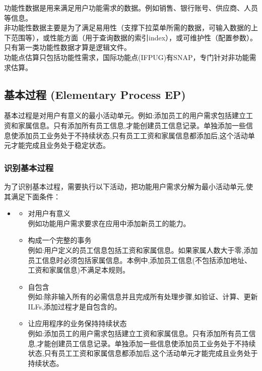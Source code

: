 功能性数据是用来满足用户功能需求的数据。例如销售、银行账号、供应商、人员等信息。\\
非功能性数据主要是为了满足易用性（支撑下拉菜单所需的数据，可输入数据的上下范围等），或性能方面（用于查询数据的索引index），或可维护性（配置参数）。\\
只有第一类功能性数据才算是逻辑文件。\\
功能点估算只包括功能性需求，国际功能点(IFPUG)有SNAP，专门针对非功能需求估算。

\hypertarget{ux57faux672cux8fc7ux7a0b-elementary-process}{%
\subsection{基本过程 (Elementary
Process EP)}\label{ux57faux672cux8fc7ux7a0b-elementary-process}}

基本过程是对用户有意义的最小活动单元。例如:添加员工的用户需求包括建立工资和家属信息。只有添加所有员工信息,才能创建员工信息记录。单独添加一些信息使添加员工业务处于不持续状态,只有员工工资和家属信息都添加后,这个活动单元才能完成且业务处于稳定状态。

\hypertarget{ux8bc6ux522bux57faux672cux8fc7ux7a0b}{%
\subsubsection{识别基本过程}\label{ux8bc6ux522bux57faux672cux8fc7ux7a0b}}

为了识别基本过程，需要执行以下活动，把功能用户需求分解为最小活动单元,使其满足下面条件：

\begin{itemize}
\item
  \begin{itemize}
  \tightlist
  \item
    对用户有意义\\
    例如功能用户需求要求在应用中添加新员工的能力。\\
  \item
    构成一个完整的事务\\
    例如:用户定义的员工信息包括工资和家属信息。如果家属人数大于零,添加员工信息时必须包括家属信息。本例中,添加员工信息(不包括添加地址、工资和家属信息)不满足本规则。\\
  \item
    自包含\\
    例如:除非输入所有的必需信息并且完成所有处理步骤,如验证、计算、更新ILFs,添加过程才是自包含的。\\
  \item
    让应用程序的业务保持持续状态\\
    例如:添加员工的用户需求包括建立工资和家属信息。只有添加所有员工信息,才能创建员工信息记录。单独添加一些信息使添加员工业务处于不持续状态,只有员工工资和家属信息都添加后,这个活动单元才能完成且业务处于持续状态。\\
  \end{itemize}
\end{itemize}

